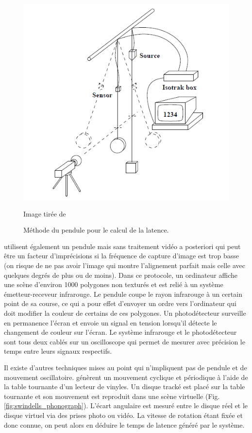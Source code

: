 	\begin{figure}
		\centering
		\includegraphics[scale=.75]{Figures/LiangPendulum}
		\caption{Méthode du pendule pour le calcul de la latence.}{Image tirée de \citep{liang_temporal-spatial_1991}}
		\label{fig:liang_pendulum}
	\end{figure}
	
	\par \citep{jacoby_improved_1996} utilisent également un pendule mais sans traitement vidéo a posteriori qui peut être un facteur d'imprécisions si la fréquence de capture d'image est trop basse (on risque de ne pas avoir l'image qui montre l'alignement parfait mais celle avec quelques degrés de plus ou de moins). Dans ce protocole, un ordinateur affiche une scène d'environ 1000 polygones non texturés et est relié à un système émetteur-receveur infrarouge. Le pendule coupe le rayon infrarouge à un certain point de sa course, ce qui a pour effet d'envoyer un ordre vers l'ordinateur qui doit modifier la couleur de certains de ces polygones. Un photodétecteur surveille en permanence l'écran et envoie un signal en tension lorsqu'il détecte le changement de couleur sur l'écran. Le système infrarouge et le photodétecteur sont tous deux cablés sur un oscilloscope qui permet de mesurer avec précision le temps entre leurs signaux respectifs.
	
	\par Il existe d'autres techniques mises au point qui n'impliquent pas de pendule et de mouvement oscillatoire. \citep{swindells_system_2000} génèrent un mouvement cyclique et périodique à l'aide de la table tournante d'un lecteur de vinyles. Un disque tracké est placé sur la table tournante et son mouvement est reproduit dans une scène virtuelle (Fig. \ref{fig:swindells_phonograph}). L'écart angulaire est mesuré entre le disque réel et le disque virtuel via des prises photo ou vidéo. La vitesse de rotation étant fixée et donc connue, on peut alors en déduire le temps de latence généré par le système.
	
